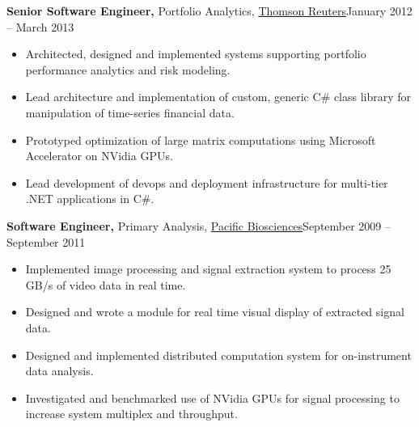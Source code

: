 \documentclass{article}
\begin{document}
{\bf Senior Software Engineer,} Portfolio Analytics, \href{https://www.thomsonreuters.com}{Thomson Reuters}\hfill January 2012 -- March 2013
\begin{itemize} \itemsep -2pt
    
    \item Architected, designed and implemented systems supporting portfolio performance analytics and risk modeling.
    
    \item Lead architecture and implementation of custom, generic C\# class library for manipulation of time-series financial data.
    
    \item Prototyped optimization of large matrix computations using Microsoft Accelerator on NVidia GPUs.
    
    \item Lead development of devops and deployment infrastructure for multi-tier .NET applications in C\#.
    
\end{itemize}
\newpage
{\bf Software Engineer,} Primary Analysis, \href{http://www.pacb.com/}{Pacific Biosciences}\hfill September 2009 -- September 2011
\begin{itemize} \itemsep -2pt
    
	\item Implemented image processing and signal extraction system to process 25 GB/s of video data in real time.
    
    \item Designed and wrote a module for real time visual display of extracted signal data.
    
	\item Designed and implemented distributed computation system for on-instrument data analysis.
	
	\item Investigated and benchmarked use of NVidia GPUs for signal processing to increase system multiplex and throughput.
    
\end{itemize}
\end{document}
